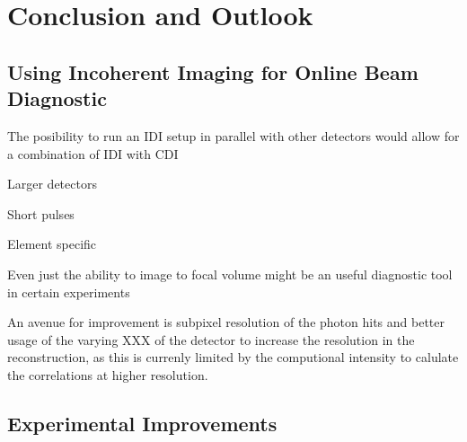\chapter{Conclusion and Outlook}


\section{Using Incoherent Imaging for Online Beam Diagnostic}



The posibility to run an IDI setup in parallel with other detectors would allow for a combination of IDI with CDI

Larger detectors

Short pulses

Element specific 


Even just the ability to image to focal volume might be an useful diagnostic tool in certain experiments


An avenue for improvement is subpixel resolution of the photon hits and better usage of the varying XXX of the detector to increase the resolution in the reconstruction, as this is currenly limited by the computional intensity to calulate the correlations at higher resolution.




\section{Experimental Improvements}



